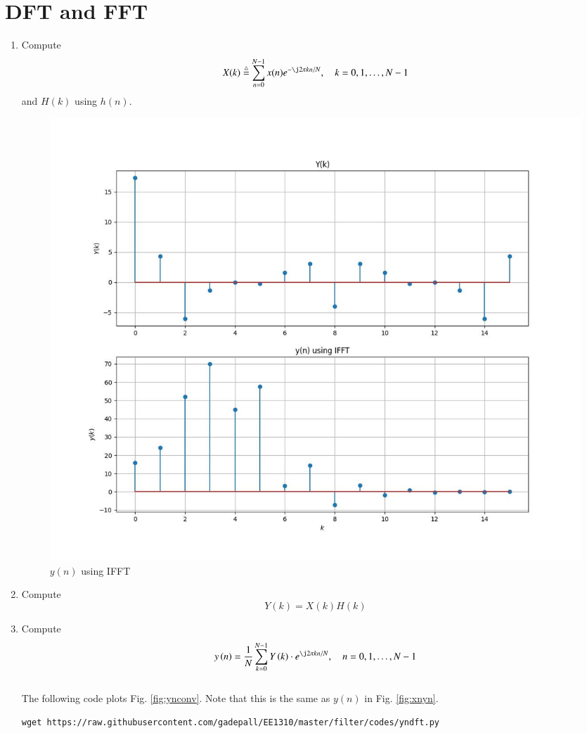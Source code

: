 \documentclass[journal,12pt,twocolumn]{IEEEtran}
\renewcommand\thesection{\arabic{section}}
\begin{document}
\section{DFT and FFT}
\begin{enumerate}[label=\thesection.\arabic*]
	\item
	Compute
	\begin{equation}
		X(k) \define \sum _{n=0}^{N-1}x(n) e^{-\j2\pi kn/N}, \quad k = 0,1,\dots, N-1
	\end{equation}
	and $H(k)$ using $h(n)$.
		\begin{figure}[!ht]
		\centering
		\includegraphics[width=\columnwidth]{./figs/e6.4-IFFT.jpg}
		\caption{$y(n)$ using IFFT}
		\label{fig:ifft}
	\end{figure}
	\item Compute 
	\begin{equation}
		Y(k) = X(k)H(k)
	\end{equation}
	\item Compute
	\begin{equation}
		y\brak{n}={\frac {1}{N}}\sum _{k=0}^{N-1}Y\brak{k}\cdot e^{\j 2\pi kn/N},\quad n = 0,1,\dots, N-1
	\end{equation}
	\\
	\solution The following code plots Fig. \ref{fig:ynconv}. Note that this is the same as 
	$y(n)$ in  Fig. 
	\ref{fig:xnyn}. 
	\begin{lstlisting}
wget https://raw.githubusercontent.com/gadepall/EE1310/master/filter/codes/yndft.py
	\end{lstlisting}

\end{enumerate}
\end{document}
